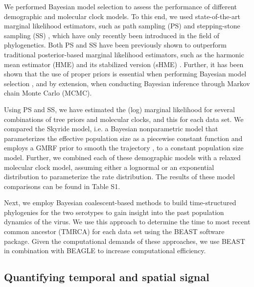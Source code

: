 \documentclass[10pt]{article}
\begin{document}
We performed Bayesian model selection to assess the performance of different demographic and molecular clock models.
To this end, we used state-of-the-art marginal likelihood estimators, such as path sampling (PS) \cite{LartillotPhilippe} and stepping-stone sampling (SS) \cite{Xie}, which have only recently been introduced in the field of phylogenetics.
Both PS and SS have been previously shown to outperform traditional posterior-based marginal likelihood estimators, such as the harmonic mean estimator (HME) and its stabilized version (sHME) \cite{LartillotPhilippe,Xie,Baele2012,Baele2013a,Baele2013b}.
Further, it has been shown that the use of proper priors is essential when performing Bayesian model selection \cite{Baele2013a}, and by extension, when conducting Bayesian inference through Markov chain Monte Carlo (MCMC).
                                                                       

Using PS and SS, we have estimated the (log) marginal likelihood for several combinations of tree priors and molecular clocks, and this for each data set.
We compared the Skyride model, i.e. a Bayesian nonparametric model that parameterizes the effective population size as a piecewise constant function and employs a GMRF prior to smooth the trajectory \cite{skygrid}, to a constant population size model.
Further, we combined each of these demographic models with a relaxed molecular clock model, assuming either a lognormal or an exponential distribution to parameterize the rate distribution.
The results of these model comparisons can be found in Table S1.

Next, we employ Bayesian coalescent-based methods to build time-structured phylogenies for the two serotypes to gain insight into the past population dynamics of the virus.
We use this approach to determine the time to most recent common ancestor (TMRCA) for each data set using the BEAST \cite{BEAST} software package.
 Given the computational demands of these approaches, we use BEAST \cite{BEAST} in combination with BEAGLE \cite{BEAGLE} to increase computational efficiency.


\subsection*{Quantifying temporal and spatial signal} 
\end{document}
